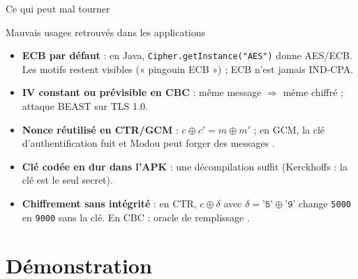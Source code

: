 \documentclass[aspectratio=169,10pt]{beamer}
\begin{document}
\begin{frame}{Ce qui peut mal tourner}
  \begin{alertblock}{Mauvais usages retrouvés dans les applications}
    \begin{itemize}
      \item \textbf{ECB par défaut} : en Java, \texttt{Cipher.getInstance("AES")} donne AES/ECB.
            Les motifs restent visibles (« pingouin ECB ») ; ECB n'est jamais IND-CPA.
      \item \textbf{IV constant ou prévisible en CBC} : même message $\Rightarrow$ même chiffré ; attaque BEAST sur TLS 1.0.
      \item \textbf{Nonce réutilisé en CTR/GCM} : $c \oplus c' = m \oplus m'$ ;
            en GCM, la clé d'authentification fuit et Modou peut forger des messages \cite{joux2006}.
      \item \textbf{Clé codée en dur dans l'APK} : une décompilation suffit (Kerckhoffs : la clé est le seul secret).
      \item \textbf{Chiffrement sans intégrité} : en CTR, $c \oplus \delta$ avec $\delta = \texttt{'5'}\oplus\texttt{'9'}$
            change \texttt{5000} en \texttt{9000} sans la clé. En CBC : oracle de remplissage \cite{vaudenay2002}.
    \end{itemize}
  \end{alertblock}
\end{frame}

\section{Démonstration}
\end{document}
